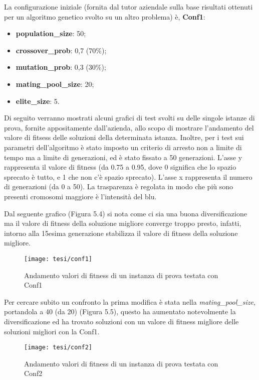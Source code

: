 \noindent La configurazione iniziale (fornita dal tutor aziendale sulla base risultati ottenuti per un algoritmo genetico svolto su un altro problema) è, \textbf{Conf1}:
\begin{itemize}
	\item\textbf{population\_size}: 50;
	\item\textbf{crossover\_prob}: 0,7 (70\%);
	\item\textbf{mutation\_prob}: 0,3 (30\%);
	\item\textbf{mating\_pool\_size}: 20;
	\item\textbf{elite\_size}: 5.
\end{itemize}

Di seguito verranno mostrati alcuni grafici di test svolti su delle singole istanze di prova, fornite appositamente dall'azienda, allo scopo di mostrare l'andamento del valore di fitsess delle soluzioni della determinata istanza. Inoltre, per i test sui parametri dell'algoritmo è stato imposto un criterio di arresto non a limite di tempo ma a limite di generazioni, ed è stato fissato a 50 generazioni. 
L'asse y rappresenta il valore di fitness (da 0.75 a 0.95, dove 0 significa che lo spazio sprecato è tutto, e 1 che non c'è spazio sprecato). L'asse x rappresenta il numero di generazioni (da 0 a 50).
La trasparenza è regolata in modo che più sono presenti cromosomi maggiore è l'intensità del blu.

Dal seguente grafico (Figura 5.4) si nota come ci sia una buona diversificazione ma il valore di fitness della soluzione migliore converge troppo presto, infatti, intorno alla 15esima generazione stabilizza il valore di fitness della soluzione migliore. 

\begin{figure}[!ht] 
    \centering 
    \texttt{[image: tesi/conf1]} 
    \caption{Andamento valori di fitness di un instanza di prova testata con Conf1}
\end{figure}

Per cercare subito un confronto la prima modifica è stata nella \emph{mating\_pool\_size}, portandola a 40 (da 20) (Figura 5.5), questo ha aumentato notevolmente la diversificazione ed ha trovato soluzioni con un valore di fitness migliore delle soluzioni migliori con la Conf1. 

\begin{figure}[!ht] 
    \centering 
    \texttt{[image: tesi/conf2]} 
    \caption{Andamento valori di fitness di un instanza di prova testata con Conf2}
\end{figure}


